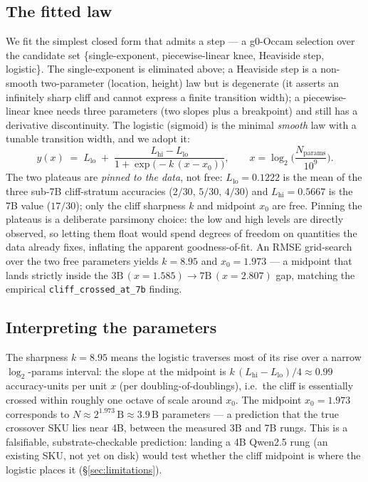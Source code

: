 \documentclass[11pt,a4paper]{article}
\begin{document}
\subsection{The fitted law}
We fit the simplest closed form that admits a step --- a g0-Occam selection
over the candidate set \{single-exponent, piecewise-linear knee, Heaviside
step, logistic\}. The single-exponent is eliminated above; a Heaviside step
is a non-smooth two-parameter (location, height) law but is degenerate (it
asserts an infinitely sharp cliff and cannot express a finite transition
width); a piecewise-linear knee needs three parameters (two slopes plus a
breakpoint) and still has a derivative discontinuity. The logistic (sigmoid)
is the minimal \emph{smooth} law with a tunable transition width, and we
adopt it:
\begin{equation}
  y(x) \;=\; L_{\mathrm{lo}} \;+\;
  \frac{L_{\mathrm{hi}} - L_{\mathrm{lo}}}{1 + \exp\!\big(-k\,(x - x_0)\big)},
  \qquad x = \log_2\!\Big(\frac{N_{\mathrm{params}}}{10^{9}}\Big).
  \label{eq:logistic}
\end{equation}
The two plateaus are \emph{pinned to the data}, not free:
\(L_{\mathrm{lo}} = 0.1222\) is the mean of the three sub-7B cliff-stratum
accuracies (\(2/30,\,5/30,\,4/30\)) and \(L_{\mathrm{hi}} = 0.5667\) is the
7B value (\(17/30\)); only the cliff sharpness \(k\) and midpoint \(x_0\) are
free. Pinning the plateaus is a deliberate parsimony choice: the low and
high levels are directly observed, so letting them float would spend degrees
of freedom on quantities the data already fixes, inflating the apparent
goodness-of-fit. An RMSE grid-search over the two free parameters yields
\(k = 8.95\) and \(x_0 = 1.973\) --- a midpoint that lands strictly inside
the \(3\text{B}\,(x{=}1.585) \to 7\text{B}\,(x{=}2.807)\) gap, matching the
empirical \texttt{cliff\_crossed\_at\_7b} finding.

\subsection{Interpreting the parameters}
The sharpness \(k=8.95\) means the logistic traverses most of its rise over a
narrow \(\log_2\)-params interval: the slope at the midpoint is
\(k\,(L_{\mathrm{hi}}-L_{\mathrm{lo}})/4 \approx 0.99\) accuracy-units per
unit \(x\) (per doubling-of-doublings), i.e.\ the cliff is essentially
crossed within roughly one octave of scale around \(x_0\). The midpoint
\(x_0 = 1.973\) corresponds to \(N \approx 2^{1.973}\,\text{B} \approx
3.9\,\text{B}\) parameters --- a prediction that the true crossover SKU lies
near 4B, between the measured 3B and 7B rungs. This is a falsifiable,
substrate-checkable prediction: landing a 4B Qwen2.5 rung (an existing SKU,
not yet on disk) would test whether the cliff midpoint is where the logistic
places it (§\ref{sec:limitations}).
\end{document}
